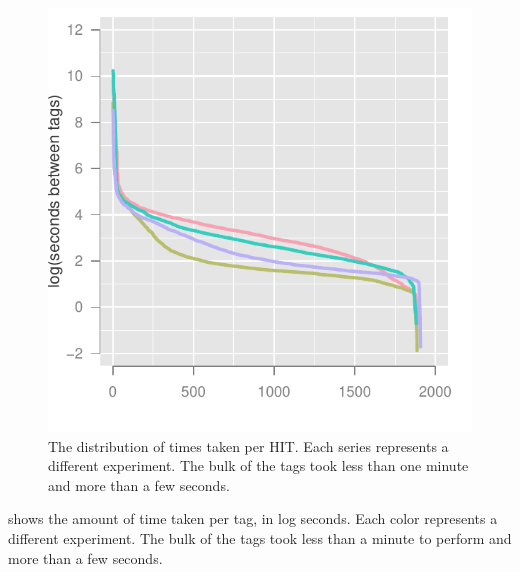 \begin{figure}
\centering
\includegraphics[width = .9\linewidth]{figures/hit_times}
\caption{The distribution of times taken per HIT.  Each series represents a different experiment.  The bulk of the tags took less than one minute and more than a few seconds.}
\label{fig:times}
\end{figure}

 shows the amount of time taken per tag, in log
seconds. Each color represents a different experiment.  The bulk of
the tags took less than a minute to perform and more than a few
seconds.

